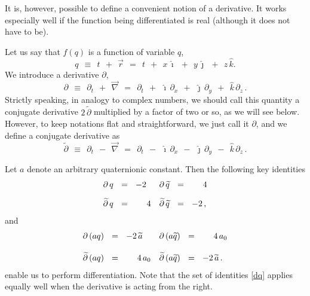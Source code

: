 \documentclass[epsfig,12pt]{article}
\newcommand{\p}{\partial}
\newcommand{\wt}{\widetilde}
\newcommand{\ii}{\hat\imath}
\newcommand{\jj}{\hat\jmath}
\newcommand{\kk}{\hat k}
\begin{document}
	It is, however, possible to define a convenient notion of a derivative.
	It works especially well if the function being differentiated is real (although it does not have to be).

	Let us say that $ f(q) $ is a function of variable $ q $,
\begin{equation}
	q	~~\equiv~~	t  ~~+~~  \vec r	~~=~~	t  ~~+~~  x\,\ii  ~~+~~  y\,\jj  ~~+~~  z\,\kk.
\end{equation}
	We introduce a derivative $ \p $,
\begin{equation}
\label{diff-d}
	\p	~~\equiv~~   \p_t  ~~+~~  \vec\nabla	~~=~~	\p_t  ~~+~~  
								\ii\,\p_x  ~~+~~  \jj\,\p_y  ~~+~~  \kk\,\p_z\,.
\end{equation}
	Strictly speaking, in analogy to complex numbers,
	we should call this quantity a conjugate derivative $ 2\,\wt\p $ multiplied by a factor of two or so,
	as we will see below. However, to keep notations flat and straightforward, we just
	call it $ \p $, and we define a conjugate derivative as
\begin{equation}
\label{diff-d-conj}
	\wt\p	~~\equiv~~   \p_t  ~~-~~  \vec\nabla	~~=~~	\p_t  ~~-~~  
								\ii\,\p_x  ~~-~~  \jj\,\p_y  ~~-~~  \kk\,\p_z\,.
\end{equation}

	Let $ a $ denote an arbitrary quaternionic constant.
	Then the following key identities
\begin{align}
%
\notag
	\p\,q		& ~~=~~		-2		& \p\,\wt q	& ~~=~~		~~~~4\\[2mm]
%
\label{dq}
	\wt\p\,q	& ~~=~~		~~~~4		& \wt\p\,\wt q	& ~~=~~		-2\,,
\end{align}
	and
\begin{align}
%
\notag
	\p\, (a q)	& ~~=~~		-2\,\wt a	& \p\, (a \wt q)	& ~~=~~		~~~~4\,a_0\\[3mm]
%
\label{daq}
	\wt\p\, (a q)	& ~~=~~		~~~~4\,a_0	& \wt\p\, (a \wt q)	& ~~=~~		-2\,\wt a\,.
\end{align}
	enable us to perform differentiation.
	Note that the set of identities \eqref{dq} applies equally well when the derivative is acting from the right.
\end{document}
